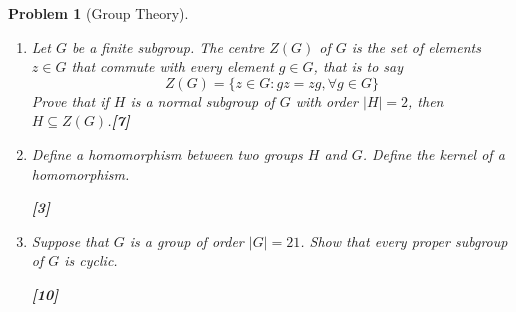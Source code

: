 \documentclass[a4paper]{article}
\theoremstyle{new}
\newtheorem{qns}{Problem}[section]
\begin{document}
\newpage
\begin{qns}[Group Theory]\leavevmode
\begin{enumerate}[label=(\alph*)]
\item Let $G$ be a finite subgroup. The centre $Z(G)$ of $G$ is the set of elements $z\in G$ that commute with every element $g\in G$, that is to say
$$Z(G) = \{z\in G : gz = zg, \forall g\in G\}$$
Prove that if $H$ is a normal subgroup of $G$ with order $|H| = 2$, then $H\subseteq Z(G)$.\hfill\textbf{[7]}
\item Define a homomorphism between two groups $H$ and $G$. Define the kernel of a homomorphism.

\hfill\textbf{[3]}
\item Suppose that $G$ is a group of order $|G| = 21$. Show that every proper subgroup of $G$ is cyclic.

\hfill\textbf{[10]}
\end{enumerate}
\end{qns}
\end{document}
